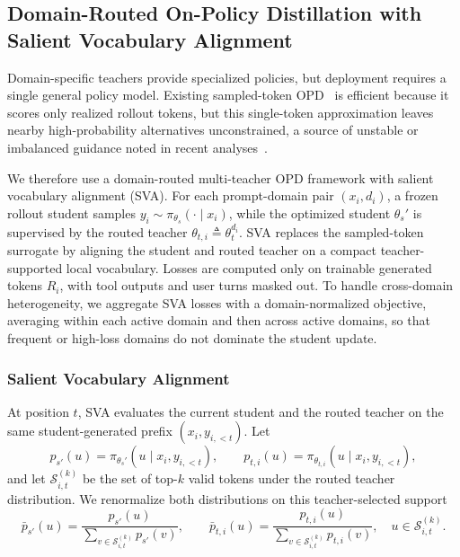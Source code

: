 \subsection{Domain-Routed On-Policy Distillation with Salient Vocabulary Alignment}
\label{subsec:on-policy-distillation}

Domain-specific teachers provide specialized policies, but deployment requires a single general policy model. Existing sampled-token OPD~\citep{lu2025onpolicydistillation} is efficient because it scores only realized rollout tokens, but this single-token approximation leaves nearby high-probability alternatives unconstrained, a source of unstable or imbalanced guidance noted in recent analyses~\citep{fu2026revisiting,deepseekai2026deepseekv4}.

We therefore use a domain-routed multi-teacher OPD framework with salient vocabulary alignment (SVA). For each prompt-domain pair $(x_i,d_i)$, a frozen rollout student samples $y_i\sim\pi_{\theta_s}(\cdot\mid x_i)$, while the optimized student $\theta_s'$ is supervised by the routed teacher $\theta_{t,i}\triangleq\theta_t^{d_i}$. SVA replaces the sampled-token surrogate by aligning the student and routed teacher on a compact teacher-supported local vocabulary. Losses are computed only on trainable generated tokens $R_i$, with tool outputs and user turns masked out. To handle cross-domain heterogeneity, we aggregate SVA losses with a domain-normalized objective, averaging within each active domain and then across active domains, so that frequent or high-loss domains do not dominate the student update.

\subsubsection{Salient Vocabulary Alignment}

At position $t$, SVA evaluates the current student and the routed teacher on the same student-generated prefix $(x_i,y_{i,<t})$. Let
\[
p_{s'}(u)=\pi_{\theta_s'}(u\mid x_i,y_{i,<t}),
\qquad
p_{t,i}(u)=\pi_{\theta_{t,i}}(u\mid x_i,y_{i,<t}),
\]
and let $\mathcal{S}_{i,t}^{(k)}$ be the set of top-$k$ valid tokens under the routed teacher distribution. We renormalize both distributions on this teacher-selected support
\[
\bar p_{s'}(u)
=
\frac{p_{s'}(u)}
{\sum_{v\in\mathcal{S}_{i,t}^{(k)}}p_{s'}(v)},
\qquad
\bar p_{t,i}(u)
=
\frac{p_{t,i}(u)}
{\sum_{v\in\mathcal{S}_{i,t}^{(k)}}p_{t,i}(v)},
\quad
u\in\mathcal{S}_{i,t}^{(k)}.
\]

